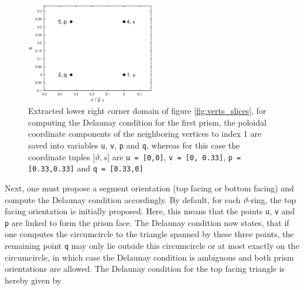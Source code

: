 \documentclass[./main.tex]{subfiles}
\begin{document}
 \begin{figure}[!ht]
 \begin{center}
	\includegraphics[width=0.5\textwidth]{figures/uvpq.eps}
	\caption{Extracted lower right corner domain of figure \ref{fig:verts_slices}, for computing the Delaunay condition for the first prism, the poloidal coordinate components of the neighboring vertices to index 1 are saved into variables \texttt{u}, \texttt{v}, \texttt{p} and \texttt{q}, whereas for this case the coordinate tuples [$\vartheta, s$] are \texttt{u = [0,0]}, \texttt{v = [0, 0.33]}, \texttt{p = [0.33,0.33]} and \texttt{q = [0.33,0]}}
	\label{fig:uvpq}
	\end{center} 
\end{figure}
Next, one must propose a segment orientation (top facing or bottom facing) and compute the Delaunay condition accordingly. By default, for each $\vartheta$-ring, the top facing orientation is initially proposed. Here, this means that the points \texttt{u}, \texttt{v} and \texttt{p} are linked to form the prism face. The Delaunay condition now states, that if one computes the circumcircle to the triangle spanned by these three points, the remaining point \texttt{q} may only lie outside this circumcircle or at most exactly on the circumcircle, in which case the Delaunay condition is ambiguous and both prism orientations are allowed.
The Delaunay condition for the top facing triangle is hereby given by \cite{Delaunay_triangulation}
\end{document}
